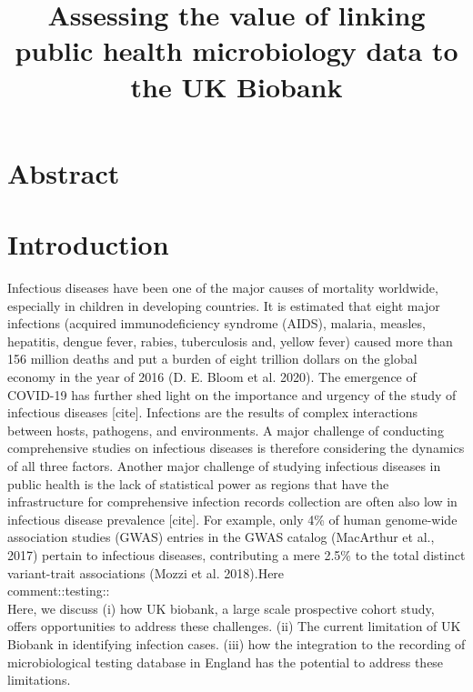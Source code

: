 \documentclass{article}
\begin{document}
\title{Assessing the value of linking public health microbiology data to the UK Biobank}

\section{Abstract}

\section{Introduction}

Infectious diseases have been one of the major causes of mortality worldwide, especially in children in developing countries. It is estimated that eight major infections (acquired immunodeficiency syndrome (AIDS), malaria, measles, hepatitis, dengue fever, rabies, tuberculosis and, yellow fever) caused more than 156 million deaths and put a burden of eight trillion dollars on the global economy in the year of 2016 (D. E. Bloom et al. 2020). The emergence of COVID-19 has further shed light on the importance and urgency of the study of infectious diseases [cite]. Infections are the results of complex interactions between hosts, pathogens, and environments. A major challenge of conducting comprehensive studies on infectious diseases is therefore considering the dynamics of all three factors. Another major challenge of studying infectious diseases in public health is the lack of statistical power as regions that have the infrastructure for comprehensive infection records collection are often also low in infectious disease prevalence [cite]. For example, only 4\% of human genome-wide association studies (GWAS) entries in the GWAS catalog (MacArthur et al., 2017) pertain to infectious diseases, contributing a mere 2.5\% to the total distinct variant-trait associations (Mozzi et al. 2018).Here
\\
comment::testing::
\\
Here, we discuss (i) how UK biobank, a large scale prospective cohort study, offers opportunities to address these challenges. (ii) The current limitation of UK Biobank in identifying infection cases. (iii) how the integration to the recording of microbiological testing database in England has the potential to address these limitations.
\end{document}
